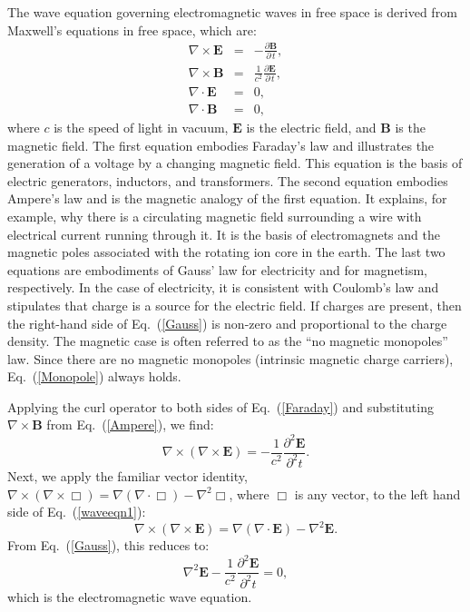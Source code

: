 \documentclass[preprint,footinbib,preprintnumbers,amsmath,amssymb,prb,12pt]{revtex4}
\begin{document}
The wave equation governing electromagnetic waves in free space is
derived from Maxwell's equations in free space, which are:
\begin{eqnarray}
\nabla\times\mathbf{E}&=&-\frac{\partial\mathbf{B}}{\partial\,t},\label{Faraday}\\
\nabla\times\mathbf{B}&=&\frac{1}{c^2}\frac{\partial\mathbf{E}}{\partial\,t},\label{Ampere}\\
\nabla\cdot\mathbf{E}&=&0,\label{Gauss}\\
\nabla\cdot\mathbf{B}&=&0,\label{Monopole}
\end{eqnarray}
where $c$ is the speed of light in vacuum, $\mathbf{E}$ is the
electric field, and $\mathbf{B}$ is the magnetic field. The first
equation embodies Faraday's law and illustrates the generation of a
voltage by a changing magnetic field. This equation is the basis of
electric generators, inductors, and transformers. The second
equation embodies Ampere's law and is the magnetic analogy of the
first equation. It explains, for example, why there is a circulating
magnetic field surrounding a wire with electrical current running
through it. It is the basis of electromagnets and the magnetic poles
associated with the rotating ion core in the earth. The last two
equations are embodiments of Gauss' law for electricity and for
magnetism, respectively. In the case of electricity, it is
consistent with Coulomb's law and stipulates that charge is a source
for the electric field. If charges are present, then the right-hand
side of Eq.~(\ref{Gauss}) is non-zero and proportional to the charge
density. The magnetic case is often referred to as the ``no magnetic
monopoles'' law. Since there are no magnetic monopoles (intrinsic
magnetic charge carriers), Eq.~(\ref{Monopole}) always holds.

Applying the curl operator to both sides of Eq.~(\ref{Faraday}) and substituting $\nabla\times\mathbf{B}$ from Eq.~(\ref{Ampere}), we find:
\begin{equation}
\nabla\times(\nabla\times\mathbf{E})=-\frac{1}{c^2}\frac{\partial^2\mathbf{E}}{\partial^2t}\label{waveeqn1}.
\end{equation}
Next, we apply the familiar vector identity\cite{jackson}, $\nabla\times(\nabla\times\Box)=\nabla(\nabla\cdot\Box)-\nabla^2\Box$, where $\Box$ is any vector, to the left hand side of Eq.~(\ref{waveeqn1}):
\begin{equation}
\nabla\times(\nabla\times\mathbf{E})=\nabla(\nabla\cdot\mathbf{E})-\nabla^2\mathbf{E}\label{waveeqn2}.
\end{equation}
From Eq.~(\ref{Gauss}), this reduces to:
\begin{equation}
\nabla^2\mathbf{E}-\frac{1}{c^2}\frac{\partial^2\mathbf{E}}{\partial^2t}=0,\label{waveeqn3}
\end{equation}
which is the electromagnetic wave equation.
\end{document}
